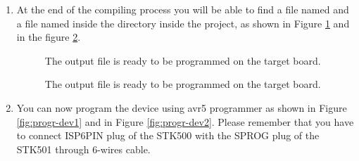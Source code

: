 \begin{enumerate}
\item At the end of the compiling process you will be able to find a
  file named  and a file named  inside the 
   directory inside the project, as shown in Figure
  \ref{fig:elf-file} and in the figure \ref{fig:srec-file}.

\begin{figure}[htb]
\caption{The output file is ready to be programmed on the target board.}
\label{fig:elf-file}
\end{figure}


\begin{figure}[htb]
\caption{The output file is ready to be programmed on the target board.}
\label{fig:srec-file}
\end{figure}


\item
  You can now program the device using avr5 programmer as shown in Figure
  \ref{fig:progr-dev1} and in Figure \ref{fig:progr-dev2}.
  Please remember that you have to connect ISP6PIN plug of the STK500
  with the SPROG plug of the STK501 through 6-wires cable.
\end{enumerate}

